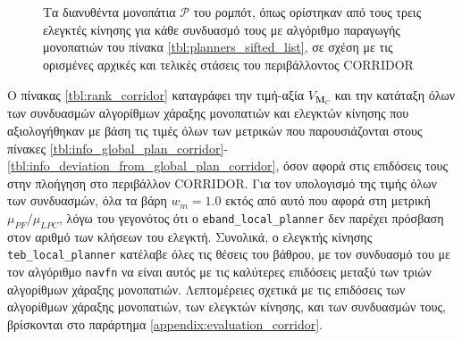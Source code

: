 \begin{figure}\centering
  \begin{subfigure}[t]{\linewidth}\hspace{-1cm}
    
  \end{subfigure}\\%
  \vspace{-1cm}
  \begin{subfigure}[t]{\linewidth}\hspace{-1cm}
    
  \end{subfigure}\\%
  \vspace{-1cm}
  \begin{subfigure}[t]{\linewidth}\hspace{-1cm}
    
  \end{subfigure}%
  \caption{\small Τα διανυθέντα μονοπάτια $\bm{\mathcal{P}}$ του ρομπότ, όπως
           ορίστηκαν από τους τρεις ελεγκτές κίνησης για κάθε συνδυασμό τους με
           αλγόριθμο παραγωγής μονοπατιών του πίνακα
           \ref{tbl:planners_sifted_list}, σε σχέση με τις ορισμένες αρχικές και
           τελικές στάσεις του περιβάλλοντος CORRIDOR}
  \label{fig:ground_truths:corridor}
\end{figure}


Ο πίνακας \ref{tbl:rank_corridor} καταγράφει την τιμή-αξία $V_{\bm{M}_C}$ και
την κατάταξη όλων των συνδυασμών αλγορίθμων χάραξης μονοπατιών και ελεγκτών
κίνησης που αξιολογήθηκαν με βάση τις τιμές όλων των μετρικών που
παρουσιάζονται στους πίνακες
\ref{tbl:info_global_plan_corridor}-\ref{tbl:info_deviation_from_global_plan_corridor},
όσον αφορά στις επιδόσεις τους στην πλοήγηση στο περιβάλλον CORRIDOR. Για τον
υπολογισμό της τιμής όλων των συνδυασμών, όλα τα βάρη $w_m = 1.0$ εκτός από
αυτό που αφορά στη μετρική $\mu_{PF} / \mu_{LPC}$, λόγω του γεγονότος ότι ο
\texttt{eband\_local\_planner} δεν παρέχει πρόσβαση στον αριθμό των κλήσεων του
ελεγκτή. Συνολικά, ο ελεγκτής κίνησης \texttt{teb\_local\_planner} κατέλαβε
όλες τις θέσεις του βάθρου, με τον συνδυασμό του με τον αλγόριθμο
\texttt{navfn} να είναι αυτός με τις καλύτερες επιδόσεις μεταξύ των τριών
αλγορίθμων χάραξης μονοπατιών. Λεπτομέρειες σχετικά με τις επιδόσεις των
αλγορίθμων χάραξης μονοπατιών, των ελεγκτών κίνησης, και των συνδυασμών τους,
βρίσκονται στο παράρτημα \ref{appendix:evaluation_corridor}.

